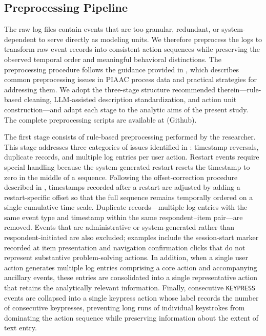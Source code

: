 \documentclass[A4paper,11pt]{article}
\begin{document}
\subsection{Preprocessing Pipeline}\label{sec:preprocessing_pipeline}

The raw log files contain events that are too granular, redundant, or system-dependent to serve directly as modeling units. We therefore preprocess the logs to transform raw event records into consistent action sequences while preserving the observed temporal order and meaningful behavioral distinctions. The preprocessing procedure follows the guidance provided in \citet{hwangbo2026tutorial}, which describes common preprocessing issues in PIAAC process data and practical strategies for addressing them. We adopt the three-stage structure recommended therein---rule-based cleaning, LLM-assisted description standardization, and action unit construction---and adapt each stage to the analytic aims of the present study. The complete preprocessing scripts are available at (Github).

The first stage consists of rule-based preprocessing performed by the researcher. This stage addresses three categories of issues identified in \citet{hwangbo2026tutorial}: timestamp reversals, duplicate records, and multiple log entries per user action. Restart events require special handling because the system-generated restart resets the timestamp to zero in the middle of a sequence. Following the offset-correction procedure described in \citet{hwangbo2026tutorial}, timestamps recorded after a restart are adjusted by adding a restart-specific offset so that the full sequence remains temporally ordered on a single cumulative time scale. Duplicate records---multiple log entries with the same event type and timestamp within the same respondent--item pair---are removed. Events that are administrative or system-generated rather than respondent-initiated are also excluded; examples include the session-start marker recorded at item presentation and navigation confirmation clicks that do not represent substantive problem-solving actions. In addition, when a single user action generates multiple log entries comprising a core action and accompanying ancillary events, these entries are consolidated into a single representative action that retains the analytically relevant information. Finally, consecutive \texttt{KEYPRESS} events are collapsed into a single keypress action whose label records the number of consecutive keypresses, preventing long runs of individual keystrokes from dominating the action sequence while preserving information about the extent of text entry.
\end{document}
